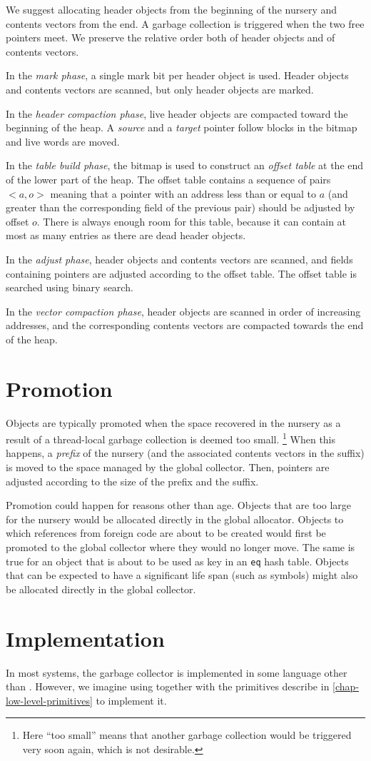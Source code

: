 We suggest allocating header objects from the beginning of the nursery
and contents vectors from the end.  A garbage collection is triggered
when the two free pointers meet.  We preserve the relative order both
of header objects and of contents vectors. 

In the \emph{mark phase}, a single mark bit per header object is
used.  Header objects and contents vectors are scanned, but only
header objects are marked.  

In the \emph{header compaction phase}, live header objects are compacted
toward the beginning of the heap.  A \emph{source} and a \emph{target}
pointer follow blocks in the bitmap and live words are moved. 

In the \emph{table build phase}, the bitmap is used to construct an
\emph{offset table} at the end of the lower part of the heap.  The
offset table contains a sequence of pairs $<a,o>$ meaning that a
pointer with an address less than or equal to $a$ (and greater than
the corresponding field of the previous pair) should be adjusted by
offset $o$.  There is always enough room for this table, because it
can contain at most as many entries as there are dead header objects.  

In the \emph{adjust phase}, header objects and contents vectors are
scanned, and fields containing pointers are adjusted according to the
offset table.  The offset table is searched using binary search. 

In the \emph{vector compaction phase}, header objects are scanned in
order of increasing addresses, and the corresponding contents vectors
are compacted towards the end of the heap.

\section{Promotion}

Objects are typically promoted when the space recovered in the nursery
as a result of a thread-local garbage collection is deemed too small.%
\footnote{Here ``too small'' means that another garbage collection
  would be triggered very soon again, which is not desirable.}  When
this happens, a \emph{prefix} of the nursery (and the associated
contents vectors in the suffix) is moved to the space managed by the
global collector.  Then, pointers are adjusted according to the size
of the prefix and the suffix. 

Promotion could happen for reasons other than age.  Objects that are
too large for the nursery would be allocated directly in the global
allocator.  Objects to which references from foreign code are
about to be created would first be promoted to the global collector
where they would no longer move.  The same is true for an object that
is about to be used as key in an \texttt{eq} hash table.  Objects that
can be expected to have a significant life span (such as symbols)
might also be allocated directly in the global collector. 

\section{Implementation}

In most systems, the garbage collector is implemented in some language
other than \cl{}.  However, we imagine using \cl{} together with the
primitives describe in \ref{chap-low-level-primitives} to implement
it.  

